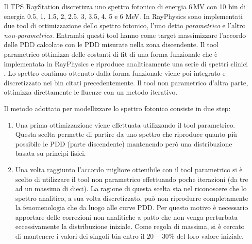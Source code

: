 Il TPS RayStation discretizza uno spettro fotonico di energia $6\,$MV con 10 bin di energia 0.5, 1, 1.5, 2, 2.5, 3, 3.5, 4, 5 e 6 MeV. In RayPhysics sono implementati due tool di ottimizzazione dello spettro fotonico, l'uno detto \textit{parametrico} e l'altro \textit{non-parametrico}. Entrambi questi tool hanno come target massimizzare l'accordo delle PDD calcolate con le PDD misurate nella zona discendente. Il tool parametrico ottimizza delle costanti di fit di una forma funzionale che è implementata in RayPhysics e riproduce analiticamente una serie di spettri clinici \cite{RaySearchLaboratories2014}. Lo spettro continuo ottenuto dalla forma funzionale viene poi integrato e discretizzato nei bin citati precedentemente. Il tool non parametrico d'altra parte, ottimizza direttamente le fluenze con un metodo iterativo.

Il metodo adottato per modellizzare lo spettro fotonico consiste in due step:
\begin{enumerate}
\item Una prima ottimizzazione viene effettuata utilizzando il tool parametrico. Questa scelta permette di partire da uno spettro che riproduce quanto più possibile le PDD (parte discendente) mantenendo però una distribuzione basata su principi fisici.
\item Una volta raggiunto l'accordo migliore ottenibile con il tool parametrico si è scelto di utilizzare il tool non parametrico effettuando poche iterazioni (da tre ad un massimo di dieci). La ragione di questa scelta sta nel riconoscere che lo spettro analitico, a sua volta discretizzato, può non riprodurre completamente la fenomenologia che da luogo alle curve PDD. Per questo motivo è necessario apportare delle correzioni non-analitiche a patto che non venga perturbata eccessivamente la distribuzione iniziale. Come regola di massima, si è cercato di mantenere i valori dei singoli bin entro il $20-30\%$ del loro valore iniziale.
\end{enumerate}

